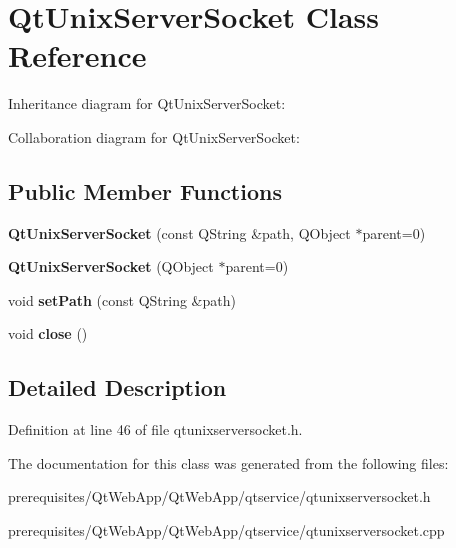 \hypertarget{class_qt_unix_server_socket}{}\section{Qt\+Unix\+Server\+Socket Class Reference}
\label{class_qt_unix_server_socket}


Inheritance diagram for Qt\+Unix\+Server\+Socket\+:


Collaboration diagram for Qt\+Unix\+Server\+Socket\+:
\subsection*{Public Member Functions}
\begin{DoxyCompactItemize}
\item 
\mbox{\label{class_qt_unix_server_socket_a9b6133aa5f66a9acf58529cdf865efe4}} 
{\bfseries Qt\+Unix\+Server\+Socket} (const Q\+String \&path, Q\+Object $\ast$parent=0)
\item 
\mbox{\label{class_qt_unix_server_socket_aa73dd123bc2ff7a7a90eb408fce90194}} 
{\bfseries Qt\+Unix\+Server\+Socket} (Q\+Object $\ast$parent=0)
\item 
\mbox{\label{class_qt_unix_server_socket_a733cf66cddbbf31d8a37675f349d2ca8}} 
void {\bfseries set\+Path} (const Q\+String \&path)
\item 
\mbox{\label{class_qt_unix_server_socket_a74bdb3e24b99bb55d7101651a2e86205}} 
void {\bfseries close} ()
\end{DoxyCompactItemize}


\subsection{Detailed Description}


Definition at line 46 of file qtunixserversocket.\+h.



The documentation for this class was generated from the following files\+:\begin{DoxyCompactItemize}
\item 
prerequisites/\+Qt\+Web\+App/\+Qt\+Web\+App/qtservice/qtunixserversocket.\+h\item 
prerequisites/\+Qt\+Web\+App/\+Qt\+Web\+App/qtservice/qtunixserversocket.\+cpp\end{DoxyCompactItemize}

